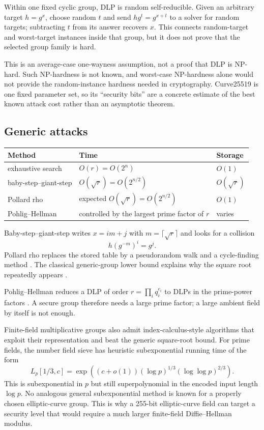 Within one fixed cyclic group, DLP is random self-reducible. Given an arbitrary
target $h=g^x$, choose random $t$ and send $hg^t=g^{x+t}$ to a solver for
random targets; subtracting $t$ from its answer recovers $x$. This connects
random-target and worst-target instances inside that group, but it does not
prove that the selected group family is hard.

This is an average-case one-wayness assumption, not a proof that DLP is
NP-hard. Such NP-hardness is not known, and worst-case NP-hardness alone would
not provide the random-instance hardness needed in cryptography. Curve25519 is
one fixed parameter set, so its ``security bits'' are a concrete estimate of
the best known attack cost rather than an asymptotic theorem.

\subsection{Generic attacks}

\begin{center}
\begin{tabular}{lll}
\toprule
Method & Time & Storage \\
\midrule
exhaustive search & $O(r)=O(2^n)$ & $O(1)$ \\
baby-step--giant-step & $O(\sqrt r)=O(2^{n/2})$ & $O(\sqrt r)$ \\
Pollard rho & expected $O(\sqrt r)=O(2^{n/2})$ & $O(1)$ \\
Pohlig--Hellman & controlled by the largest prime factor of $r$ & varies \\
\bottomrule
\end{tabular}
\end{center}

Baby-step--giant-step writes $x=im+j$ with $m=\lceil\sqrt r\rceil$ and
looks for a collision
\[
  h(g^{-m})^i=g^j.
\]
Pollard rho replaces the stored table by a pseudorandom walk and a cycle-finding
method \cite{pollard1978rho}. The classical generic-group lower bound explains
why the square root repeatedly appears \cite{shoup1997lower}.

Pohlig--Hellman reduces a DLP of order
$r=\prod_i q_i^{e_i}$ to DLPs in the prime-power factors \cite{pohlig1978}. A secure group
therefore needs a large prime factor; a large ambient field by itself is not
enough.

Finite-field multiplicative groups also admit index-calculus-style algorithms
that exploit their representation and beat the generic square-root bound. For
prime fields, the number field sieve has heuristic subexponential running time
of the form \cite{gordon1993nfs}
\[
  L_p[1/3,c]
  =\exp\!\left((c+o(1))(\log p)^{1/3}(\log\log p)^{2/3}\right).
\]
This is subexponential in $p$ but still superpolynomial in the encoded input
length $\log p$. No analogous general subexponential method is known for a
properly chosen elliptic-curve group. This is why a 255-bit elliptic-curve
field can target a security level that would require a much larger
finite-field Diffie--Hellman modulus.

